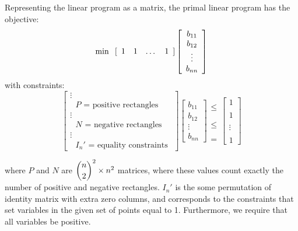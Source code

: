 \documentclass[11pt]{article}
\begin{document}
Representing the linear program as a matrix, the primal linear program has the objective:
\[ \min \hspace{.1in} [ \begin{array}{cccc} 1 & 1 & \dots & 1 \end{array} ] \left[\begin{array}{c} b_{11} \\ b_{12} \\ \vdots \\ b_{nn} \end{array} \right]\]
with constraints:
\[ \left[ \begin{array}{c} \vdots \\ \text{ $P$ = positive rectangles } \\ \vdots \\ \text{ $N$ = negative rectangles } \\ \vdots \\ \text{ $I_n'$ = equality constraints } \end{array} \right] 
\left[\begin{array}{c} b_{11} \\ b_{12} \\ \vdots \\ b_{nn} \end{array} \right] 
\begin{array}{c} \\ \leq \\ \\ \\ \leq \\ \\ \\ = \end{array} 
\left[\begin{array}{c} 1 \\\\ 1 \\\\ \vdots \\\\ 1 \end{array} \right] \]

where $P$ and $N$ are $\dbinom{n}{2}^2 \times n^2$ matrices, where these values count exactly the number of positive and negative rectangles. $I_n'$ is the some permutation of identity matrix with extra zero columns, and corresponds to the constraints that set variables in the given set of points equal to 1. Furthermore, we require that all variables be positive. 
\end{document}
